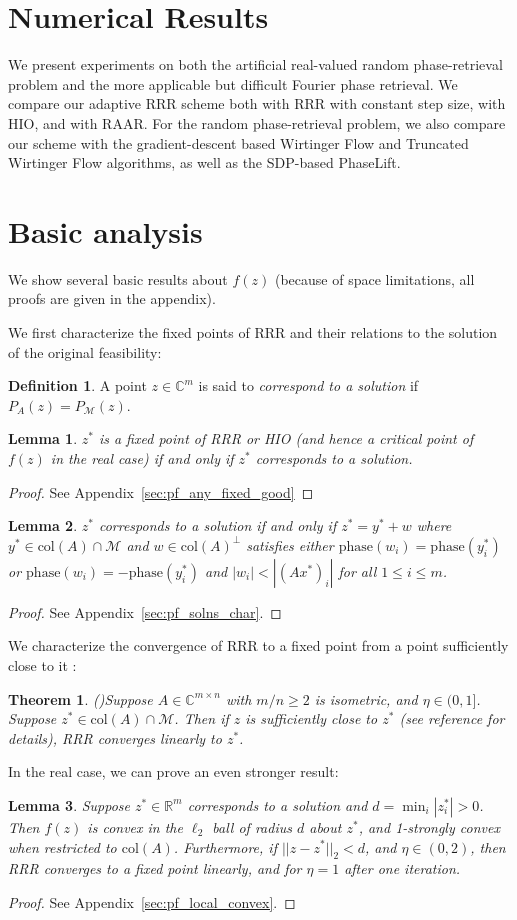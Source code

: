 \documentclass[12pt]{article}
\newtheorem{theorem}{Theorem}
\newtheorem{lemma}{Lemma}
\theoremstyle{definition}
\newtheorem{definition}{Definition}
\theoremstyle{remark}
\theoremstyle{definition}
\theoremstyle{problem}
\theoremstyle{definition}
\newcommand{\bthm}{\begin{theorem}}
\newcommand{\ethm}{\end{theorem}}
\newcommand{\blem}{\begin{lemma}}
\newcommand{\elem}{\end{lemma}}
\newcommand{\bpof}{\begin{proof}}
\newcommand{\epof}{\end{proof}}
\newcommand{\bdefn}{\begin{definition}}
\newcommand{\edefn}{\end{definition}}
\newcommand{\col}{\text{col}}
\newcommand{\RR}{\mathbb{R} }
\newcommand{\CC}{\mathbb{C}}
\newcommand{\MM}{\mathcal{M}}
\newcommand{\TODO}[1]{{\color{red}{[#1]}}}
\begin{document}
\section{Numerical Results}
\TODO{Address noise}

We present experiments on both the artificial real-valued random phase-retrieval problem and the more applicable but difficult Fourier phase retrieval. We compare our adaptive RRR scheme both with RRR with constant step size, with HIO, and with RAAR. For the random phase-retrieval problem, we also compare our scheme with the gradient-descent based Wirtinger Flow and Truncated Wirtinger Flow algorithms, as well as the SDP-based PhaseLift.

\section{Basic analysis}
We show several basic results about $f(z)$ (because of space limitations, all proofs are given in the appendix).

We first characterize the fixed points of RRR and their relations to the solution of the original feasibility:
\bdefn\label{defn:soln} A point $z\in\CC^m$ is said to \emph{correspond to a solution} if $P_A(z) = P_{\MM}(z)$. \edefn

\blem\label{lem:any_fixed_is_good} $z^*$ is a fixed point of RRR or HIO (and hence a critical point of $f(z)$ in the real case) if and only if $z^*$ corresponds to a solution. \elem
\bpof See Appendix~\ref{sec:pf_any_fixed_good} \epof

\blem\label{lem:solns_char} $z^*$ corresponds to a solution if and only if $z^* = y^* + w$ where $y^*\in\col(A)\cap \MM$ and $w\in\col(A)^{\perp}$ satisfies either $\text{phase}(w_i) = \text{phase}(y^*_i)$ or $\text{phase}(w_i) = -\text{phase}(y^*_i)$ and $|w_i|<|(Ax^*)_i|$ for all $1\leq i\leq m$. \elem
\bpof  See Appendix~\ref{sec:pf_solns_char}. \epof

We characterize the convergence of RRR to a fixed point from a point sufficiently close to it \TODO{in its basin of attraction?}:
\bthm\emph{(\cite[Thm. 3]{Li2017a})}\label{lem:lin_conver} Suppose $A\in\CC^{m\times n}$ with $m/n\geq 2$ is isometric, and $\eta\in(0,1]$. Suppose $z^*\in\col(A)\cap\MM$. Then if $z$ is sufficiently close to $z^*$ (see reference for details), RRR converges linearly to $z^*$. \ethm

In the real case, we can prove an even stronger result:
\blem\label{lem:local_convex} Suppose $z^*\in\RR^m$ corresponds to a solution and $d = \min_i|z^*_i| > 0$. Then $f(z)$ is convex in the $\ell_2$ ball of radius $d$ about $z^*$, and 1-strongly convex when restricted to $\col(A)$. Furthermore, if $||z-z^*||_2<d$, and $\eta\in(0,2)$, then RRR converges to a fixed point linearly, and for $\eta=1$ after one iteration. \elem
\bpof See Appendix~\ref{sec:pf_local_convex}. \epof
\end{document}
